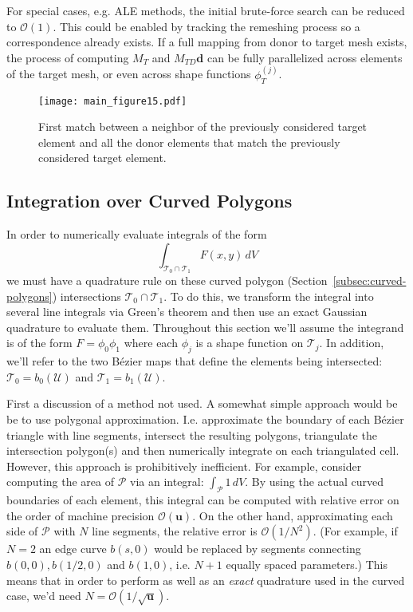 \documentclass[oneside, reqno]{amsart}
\theoremstyle{definition}
\newcommand{\bigO}[1]{\mathcal{O}\left(#1\right)}
\newcommand{\mach}{\mathbf{u}}
\newcommand{\utri}{\mathcal{U}}
\begin{document}
For special cases, e.g. ALE methods, the initial brute-force search
can be reduced to \(\bigO{1}\). This could be enabled by tracking
the remeshing process so a correspondence already exists. If a full
mapping from donor to target mesh exists, the process of computing
\(M_T\) and \(M_{TD} \bm{d}\) can be fully parallelized across
elements of the target mesh, or even across shape functions
\(\phi_T^{(j)}\).

\begin{figure}
  \texttt{[image: main\_figure15.pdf]}
  \centering
  \captionsetup{width=.75\linewidth}
  \caption{First match between a neighbor of the previously considered
    target element and all the donor elements that match the
    previously considered target element.}
  \label{fig:target-elt-neighbor}
\end{figure}

\subsection{Integration over Curved Polygons}
\label{subsec:integration-on-curved}

In order to numerically evaluate integrals of the form
\begin{equation}
\int_{\mathcal{T}_0 \cap \mathcal{T}_1} F(x, y) \, dV
\end{equation}
we must have a quadrature rule on these curved polygon
(Section~\ref{subsec:curved-polygons}) intersections
\(\mathcal{T}_0 \cap \mathcal{T}_1\).
To do this, we transform the integral into several line integrals
via Green's theorem and then use an exact Gaussian quadrature to
evaluate them. Throughout this section we'll assume the integrand
is of the form \(F = \phi_0 \phi_1\) where each \(\phi_j\) is a shape
function on \(\mathcal{T}_j\). In addition, we'll refer to the two
B\'{e}zier maps that define the elements being intersected:
\(\mathcal{T}_0 = b_0\left(\utri\right)\) and
\(\mathcal{T}_1 = b_1\left(\utri\right)\).

First a discussion of a method not used. A somewhat simple approach would be
be to use polygonal approximation. I.e. approximate the boundary of each
B\'{e}zier triangle with line segments, intersect the resulting polygons,
triangulate the intersection polygon(s) and then numerically integrate
on each triangulated cell. However, this approach is prohibitively inefficient.
For example, consider computing the area of \(\mathcal{P}\) via an
integral: \(\int_{\mathcal{P}} 1 \, dV\). By using the actual curved
boundaries of each element, this integral can be computed with relative
error on the order of machine precision \(\bigO{\mach}\). On the other hand,
approximating each side of \(\mathcal{P}\) with \(N\) line segments, the
relative error is \(\bigO{1/N^2}\). (For example, if \(N = 2\) an edge
curve \(b(s, 0)\) would be replaced by segments connecting \(b(0, 0),
b(1/2, 0)\) and \(b(1, 0)\), i.e. \(N + 1\) equally spaced parameters.) This
means that in order to perform as well as an \emph{exact} quadrature used in
the curved case, we'd need \(N = \bigO{1/\sqrt{\mach}}\).
\end{document}
